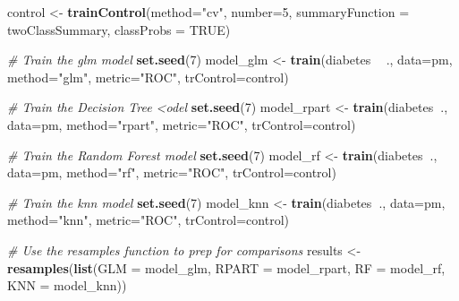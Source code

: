 \documentclass[]{book}
\newenvironment{Shaded}{\begin{snugshade}}{\end{snugshade}}
\newcommand{\KeywordTok}[1]{\textcolor[rgb]{0.13,0.29,0.53}{\textbf{#1}}}
\newcommand{\DataTypeTok}[1]{\textcolor[rgb]{0.13,0.29,0.53}{#1}}
\newcommand{\DecValTok}[1]{\textcolor[rgb]{0.00,0.00,0.81}{#1}}
\newcommand{\StringTok}[1]{\textcolor[rgb]{0.31,0.60,0.02}{#1}}
\newcommand{\CommentTok}[1]{\textcolor[rgb]{0.56,0.35,0.01}{\textit{#1}}}
\newcommand{\OtherTok}[1]{\textcolor[rgb]{0.56,0.35,0.01}{#1}}
\newcommand{\OperatorTok}[1]{\textcolor[rgb]{0.81,0.36,0.00}{\textbf{#1}}}
\newcommand{\NormalTok}[1]{#1}
\begin{document}
\begin{Shaded}
\begin{Highlighting}[]
\NormalTok{control <-}\StringTok{ }\KeywordTok{trainControl}\NormalTok{(}\DataTypeTok{method=}\StringTok{"cv"}\NormalTok{, }
                        \DataTypeTok{number=}\DecValTok{5}\NormalTok{, }
                        \DataTypeTok{summaryFunction =}\NormalTok{ twoClassSummary,}
                        \DataTypeTok{classProbs =} \OtherTok{TRUE}\NormalTok{)}

\CommentTok{# Train the glm model}
\KeywordTok{set.seed}\NormalTok{(}\DecValTok{7}\NormalTok{)}
\NormalTok{model_glm <-}\StringTok{ }\KeywordTok{train}\NormalTok{(diabetes }\OperatorTok{~}\StringTok{ }\NormalTok{., }
                   \DataTypeTok{data=}\NormalTok{pm, }
                   \DataTypeTok{method=}\StringTok{"glm"}\NormalTok{, }
                   \DataTypeTok{metric=}\StringTok{"ROC"}\NormalTok{,}
                   \DataTypeTok{trControl=}\NormalTok{control)}

\CommentTok{# Train the Decision Tree <odel}
\KeywordTok{set.seed}\NormalTok{(}\DecValTok{7}\NormalTok{)}
\NormalTok{model_rpart <-}\StringTok{ }\KeywordTok{train}\NormalTok{(diabetes}\OperatorTok{~}\NormalTok{., }
                  \DataTypeTok{data=}\NormalTok{pm, }
                  \DataTypeTok{method=}\StringTok{"rpart"}\NormalTok{, }
                  \DataTypeTok{metric=}\StringTok{"ROC"}\NormalTok{,}
                  \DataTypeTok{trControl=}\NormalTok{control)}

\CommentTok{# Train the Random Forest model}
\KeywordTok{set.seed}\NormalTok{(}\DecValTok{7}\NormalTok{)}
\NormalTok{model_rf <-}\StringTok{ }\KeywordTok{train}\NormalTok{(diabetes}\OperatorTok{~}\NormalTok{., }
                  \DataTypeTok{data=}\NormalTok{pm, }
                  \DataTypeTok{method=}\StringTok{"rf"}\NormalTok{, }
                  \DataTypeTok{metric=}\StringTok{"ROC"}\NormalTok{,}
                  \DataTypeTok{trControl=}\NormalTok{control)}

\CommentTok{# Train the knn model}
\KeywordTok{set.seed}\NormalTok{(}\DecValTok{7}\NormalTok{)}
\NormalTok{model_knn <-}\StringTok{ }\KeywordTok{train}\NormalTok{(diabetes}\OperatorTok{~}\NormalTok{., }
                  \DataTypeTok{data=}\NormalTok{pm, }
                  \DataTypeTok{method=}\StringTok{"knn"}\NormalTok{, }
                  \DataTypeTok{metric=}\StringTok{"ROC"}\NormalTok{,}
                  \DataTypeTok{trControl=}\NormalTok{control)}

\CommentTok{# Use the resamples function to prep for comparisons}
\NormalTok{results <-}\StringTok{ }\KeywordTok{resamples}\NormalTok{(}\KeywordTok{list}\NormalTok{(}\DataTypeTok{GLM   =}\NormalTok{ model_glm, }
                          \DataTypeTok{RPART =}\NormalTok{ model_rpart, }
                          \DataTypeTok{RF    =}\NormalTok{ model_rf,}
                          \DataTypeTok{KNN   =}\NormalTok{ model_knn))}
\end{Highlighting}
\end{Shaded}
\end{document}
